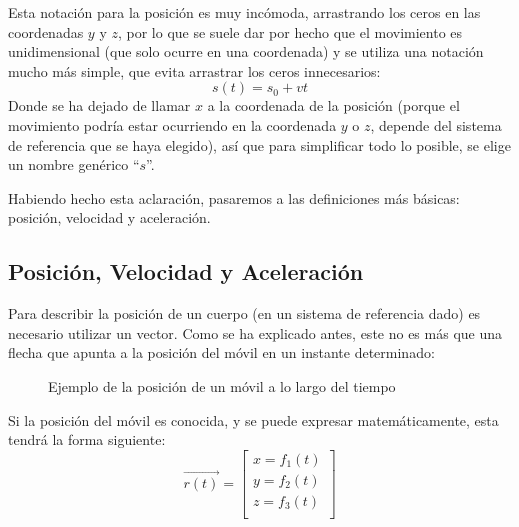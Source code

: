 \documentclass[ %
    oneside,    %
    10pt        %
]{apuntes} %
\begin{document}
Esta notación para la posición es muy incómoda, arrastrando los ceros en las coordenadas $y$ y $z$, por lo que se suele dar por hecho que el movimiento es unidimensional (que solo ocurre en una coordenada) y se utiliza una notación mucho más simple, que evita arrastrar los ceros innecesarios:
\[s(t) = s_0 + vt\]
Donde se ha dejado de llamar $x$ a la coordenada de la posición (porque el movimiento podría estar ocurriendo en la coordenada $y$ o $z$, depende del sistema de referencia que se haya elegido), así que para simplificar todo lo posible, se elige un nombre genérico ``$s$''.

Habiendo hecho esta aclaración, pasaremos a las definiciones más básicas: posición, velocidad y aceleración.

\subsection{Posición, Velocidad y Aceleración}
Para describir la posición de un cuerpo (en un sistema de referencia dado) es necesario utilizar un vector. Como se ha explicado antes, este no es más que una flecha que apunta a la posición del móvil en un instante determinado:
\begin{figure}[ht]
	\centering
	\caption{Ejemplo de la posición de un móvil a lo largo del tiempo}
	\label{fig:pos-ejemplo}
\end{figure}

Si la posición del móvil es conocida, y se puede expresar matemáticamente, esta tendrá la forma siguiente:
\[\vec{r(t)} = \left[\begin{array}{c}
			x = f_1(t) \\
			y = f_2(t) \\
			z = f_3(t) \\
		\end{array}\right]\]
\end{document}

